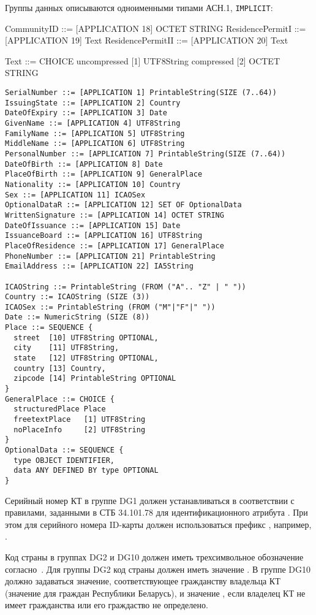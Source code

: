 Группы данных описываются одноименными типами АСН.1,
 \verb|IMPLICIT|:

CommunityID ::= [APPLICATION 18] OCTET STRING
ResidencePermitI ::= [APPLICATION 19] Text
ResidencePermitII ::= [APPLICATION 20] Text

Text ::= CHOICE {
  uncompressed [1] UTF8String
  compressed   [2] OCTET STRING
}
\fi


\begin{verbatim}
SerialNumber ::= [APPLICATION 1] PrintableString(SIZE (7..64))
IssuingState ::= [APPLICATION 2] Country
DateOfExpiry ::= [APPLICATION 3] Date
GivenName ::= [APPLICATION 4] UTF8String
FamilyName ::= [APPLICATION 5] UTF8String
MiddleName ::= [APPLICATION 6] UTF8String
PersonalNumber ::= [APPLICATION 7] PrintableString(SIZE (7..64))
DateOfBirth ::= [APPLICATION 8] Date
PlaceOfBirth ::= [APPLICATION 9] GeneralPlace
Nationality ::= [APPLICATION 10] Country
Sex ::= [APPLICATION 11] ICAOSex
OptionalDataR ::= [APPLICATION 12] SET OF OptionalData
WrittenSignature ::= [APPLICATION 14] OCTET STRING
DateOfIssuance ::= [APPLICATION 15] Date
IssuanceBoard ::= [APPLICATION 16] UTF8String
PlaceOfResidence ::= [APPLICATION 17] GeneralPlace
PhoneNumber ::= [APPLICATION 21] PrintableString
EmailAddress ::= [APPLICATION 22] IA5String

ICAOString ::= PrintableString (FROM ("A".. "Z" | " "))
Country ::= ICAOString (SIZE (3))
ICAOSex ::= PrintableString (FROM ("M"|"F"|" "))
Date ::= NumericString (SIZE (8))
Place ::= SEQUENCE {
  street  [10] UTF8String OPTIONAL,
  city    [11] UTF8String,
  state   [12] UTF8String OPTIONAL,
  country [13] Country,
  zipcode [14] PrintableString OPTIONAL
}
GeneralPlace ::= CHOICE {
  structuredPlace Place
  freetextPlace   [1] UTF8String
  noPlaceInfo     [2] UTF8String
}
OptionalData ::= SEQUENCE {
  type OBJECT IDENTIFIER,
  data ANY DEFINED BY type OPTIONAL
}
\end{verbatim}

Серийный номер КТ в группе DG1 должен устанавливаться в соответствии с правилами,
заданными в СТБ 34.101.78 для идентификационного атрибута . 
При этом для серийного номера ID-карты должен использоваться префикс ,
например, .

Код страны в группах DG2 и DG10 должен иметь трехсимвольное обозначение 
согласно~\cite{CountryCodes}. 
Для группы DG2 код страны должен иметь значение .
В группе DG10 должно задаваться значение, соответствующее
гражданству владельца КТ (значение  для граждан Республики Беларусь), 
и значение , если владелец КТ не имеет гражданства 
или его граждаство не определено.

